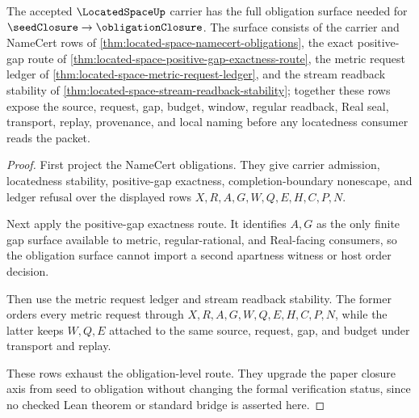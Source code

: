 \begin{theorem}
\label{thm:located-space-obligation-closure-route}
The accepted $\LocatedSpaceUp$ carrier has the full obligation surface needed for $\seedClosure \to \obligationClosure$. The surface consists of the carrier and NameCert rows of \autoref{thm:located-space-namecert-obligations}, the exact positive-gap route of \autoref{thm:located-space-positive-gap-exactness-route}, the metric request ledger of \autoref{thm:located-space-metric-request-ledger}, and the stream readback stability of \autoref{thm:located-space-stream-readback-stability}; together these rows expose the source, request, gap, budget, window, regular readback, Real seal, transport, replay, provenance, and local naming before any locatedness consumer reads the packet.
\end{theorem}
\begin{proof}
First project the NameCert obligations. They give carrier admission, locatedness stability, positive-gap exactness, completion-boundary nonescape, and ledger refusal over the displayed rows $X,R,A,G,W,Q,E,H,C,P,N$.

Next apply the positive-gap exactness route. It identifies $A,G$ as the only finite gap surface available to metric, regular-rational, and Real-facing consumers, so the obligation surface cannot import a second apartness witness or host order decision.

Then use the metric request ledger and stream readback stability. The former orders every metric request through $X,R,A,G,W,Q,E,H,C,P,N$, while the latter keeps $W,Q,E$ attached to the same source, request, gap, and budget under transport and replay.

These rows exhaust the obligation-level route. They upgrade the paper closure axis from seed to obligation without changing the formal verification status, since no checked Lean theorem or standard bridge is asserted here.
\end{proof}



